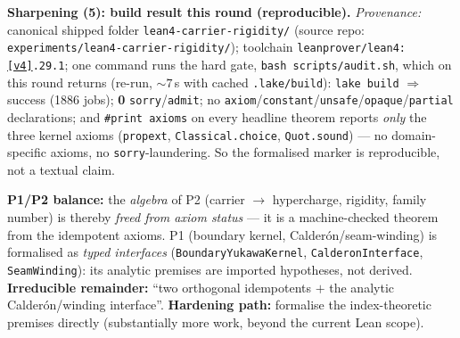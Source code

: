 \par\smallskip\noindent\textbf{Sharpening (5): build result this round (reproducible).}
\emph{Provenance:} canonical shipped folder \texttt{lean4-carrier-rigidity/} (source repo: \texttt{experiments/lean4-carrier-rigidity/}); toolchain
\texttt{leanprover/lean4:\vref{v4}.29.1}; one command runs the hard gate, \texttt{bash scripts/audit.sh},
which on this round returns (re-run, $\sim7$\,s with cached \texttt{.lake/build}):
\texttt{lake build} $\Rightarrow$ success (1886 jobs); \textbf{0} \texttt{sorry}/\texttt{admit}; no
\texttt{axiom}/\texttt{constant}/\texttt{unsafe}/\texttt{opaque}/\texttt{partial} declarations; and
\texttt{\#print axioms} on every headline theorem reports \emph{only} the three kernel axioms
(\texttt{propext}, \texttt{Classical.choice}, \texttt{Quot.sound}) --- no domain-specific axioms, no
\texttt{sorry}-laundering. So the formalised marker is reproducible, not a textual claim.

\noindent\textbf{P1/P2 balance:} the \emph{algebra} of P2 (carrier $\to$ hypercharge, rigidity, family
number) is thereby \emph{freed from axiom status} --- it is a machine-checked theorem from the
idempotent axioms. P1 (boundary kernel, Calder\'on/seam-winding) is formalised as \emph{typed
interfaces} (\texttt{BoundaryYukawaKernel}, \texttt{CalderonInterface}, \texttt{SeamWinding}): its
analytic premises are imported hypotheses, not derived. \textbf{Irreducible remainder:} ``two orthogonal
idempotents $+$ the analytic Calder\'on/winding interface''. \textbf{Hardening path:} formalise the
index-theoretic premises directly (substantially more work, beyond the current Lean scope). \mO

